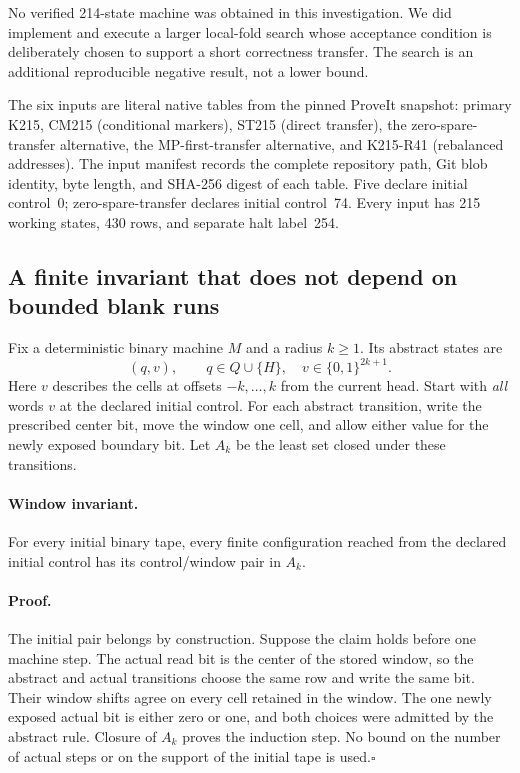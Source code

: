 No verified 214-state machine was obtained in this investigation.  We did
implement and execute a larger local-fold search whose acceptance condition
is deliberately chosen to support a short correctness transfer.  The search
is an additional reproducible negative result, not a lower bound.

The six inputs are literal native tables from the pinned ProveIt snapshot:
primary K215,
CM215 (conditional markers), ST215 (direct transfer), the zero-spare-transfer
alternative, the MP-first-transfer alternative, and K215-R41 (rebalanced
addresses).  The input manifest records the complete repository path, Git
blob identity, byte length, and SHA-256 digest of each table.  Five declare
initial control~0; zero-spare-transfer declares initial control~74.  Every
input has 215 working states, 430 rows, and separate halt label~254.

\subsection{A finite invariant that does not depend on bounded blank runs}

Fix a deterministic binary machine $M$ and a radius $k\geq1$.  Its abstract
states are
\[
 (q,v),\qquad q\in Q\cup\{H\},\quad
 v\in\{0,1\}^{2k+1}.
\]
Here $v$ describes the cells at offsets $-k,\ldots,k$ from the current head.
Start with \emph{all} words $v$ at the declared initial control.  For each
abstract transition, write the prescribed center bit, move the window one
cell, and allow either value for the newly exposed boundary bit.  Let
$A_k$ be the least set closed under these transitions.

\paragraph{Window invariant.}
For every initial binary tape, every finite configuration reached from the
declared initial control has its control/window pair in $A_k$.

\paragraph{Proof.}
The initial pair belongs by construction.  Suppose the claim holds before
one machine step.  The actual read bit is the center of the stored window,
so the abstract and actual transitions choose the same row and write the
same bit.  Their window shifts agree on every cell retained in the window.
The one newly exposed actual bit is either zero or one, and both choices
were admitted by the abstract rule.  Closure of $A_k$ proves the induction
step.  No bound on the number of actual steps or on the support of the
initial tape is used.\hfill$\square$

